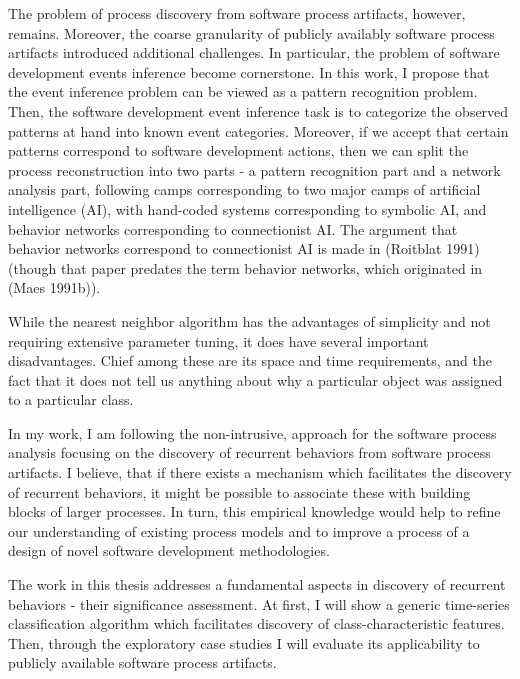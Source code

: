 The problem of process discovery from software process artifacts, however, remains. Moreover, the coarse
granularity of publicly availably software process artifacts introduced additional challenges. In particular,
the problem of software development events inference become cornerstone. 
In this work, I propose that the event inference problem can be viewed as a pattern recognition problem.
Then, the software development event inference task is to categorize the observed patterns at hand into known
event categories. Moreover, if we accept that certain patterns correspond to software development actions, then
we can split the process reconstruction into two parts - a pattern recognition part and a network analysis part,
following camps
corresponding to two
major camps of artificial intelligence (AI), with hand-coded systems corresponding to symbolic AI,
and behavior networks corresponding to connectionist AI. The argument that behavior networks
correspond to connectionist AI is made in (Roitblat 1991) (though that paper predates the term
behavior networks, which originated in (Maes 1991b)).



While the nearest neighbor algorithm has the advantages of simplicity and not
requiring extensive parameter tuning, it does have several
important disadvantages. Chief among these are its space and time
requirements, and the fact that it does not tell us anything about
why a particular object was assigned to a particular class.

In my work, I am following the non-intrusive, approach for the software process analysis focusing on the discovery 
of recurrent behaviors from software process artifacts. I believe, that if there exists a mechanism which facilitates 
the discovery of recurrent behaviors, it might be possible to associate these with building blocks of larger processes. 
In turn, this empirical knowledge would help to refine our understanding of existing process models and to improve 
a process of a design of novel software development methodologies.

The work in this thesis addresses a fundamental aspects in discovery of recurrent behaviors - their significance assessment.
At first, I will show a generic time-series classification algorithm which facilitates discovery of class-characteristic features.
Then, through the exploratory case studies I will evaluate its applicability to publicly available software process
artifacts.

